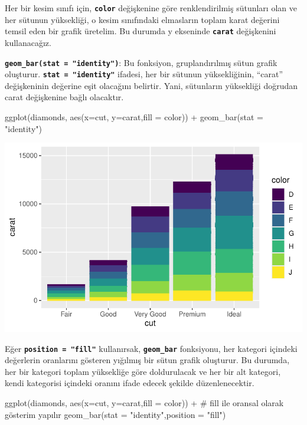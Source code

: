 \documentclass[
  letterpaper,
  DIV=11,
  numbers=noendperiod]{scrreprt}
\newenvironment{Shaded}{\begin{snugshade}}{\end{snugshade}}
\newcommand{\AttributeTok}[1]{\textcolor[rgb]{0.40,0.45,0.13}{#1}}
\newcommand{\CommentTok}[1]{\textcolor[rgb]{0.37,0.37,0.37}{#1}}
\newcommand{\FunctionTok}[1]{\textcolor[rgb]{0.28,0.35,0.67}{#1}}
\newcommand{\NormalTok}[1]{\textcolor[rgb]{0.00,0.23,0.31}{#1}}
\newcommand{\SpecialCharTok}[1]{\textcolor[rgb]{0.37,0.37,0.37}{#1}}
\newcommand{\StringTok}[1]{\textcolor[rgb]{0.13,0.47,0.30}{#1}}
\begin{document}
Her bir kesim sınıfı için, \textbf{\texttt{color}} değişkenine göre
renklendirilmiş sütunları olan ve her sütunun yüksekliği, o kesim
sınıfındaki elmasların toplam karat değerini temsil eden bir grafik
üretelim. Bu durumda y ekseninde \textbf{\texttt{carat}} değişkenini
kullanacağız.

\textbf{\texttt{geom\_bar(stat\ =\ "identity")}}: Bu fonksiyon,
gruplandırılmış sütun grafik oluşturur.
\textbf{\texttt{stat\ =\ "identity"}} ifadesi, her bir sütunun
yüksekliğinin, ``carat'' değişkeninin değerine eşit olacağını belirtir.
Yani, sütunların yüksekliği doğrudan carat değişkenine bağlı olacaktır.

\begin{Shaded}
\begin{Highlighting}[]
\FunctionTok{ggplot}\NormalTok{(diamonds, }\FunctionTok{aes}\NormalTok{(}\AttributeTok{x=}\NormalTok{cut, }\AttributeTok{y=}\NormalTok{carat,}\AttributeTok{fill =}\NormalTok{ color)) }\SpecialCharTok{+}
  \FunctionTok{geom\_bar}\NormalTok{(}\AttributeTok{stat =} \StringTok{"identity"}\NormalTok{) }
\end{Highlighting}
\end{Shaded}

\includegraphics{ggplot2_files/figure-pdf/unnamed-chunk-17-1.pdf}

Eğer \textbf{\texttt{position\ =\ "fill"}} kullanırsak,
\textbf{\texttt{geom\_bar}} fonksiyonu, her kategori içindeki değerlerin
oranlarını gösteren yığılmış bir sütun grafik oluşturur. Bu durumda, her
bir kategori toplam yüksekliğe göre doldurulacak ve her bir alt
kategori, kendi kategorisi içindeki oranını ifade edecek şekilde
düzenlenecektir.

\begin{Shaded}
\begin{Highlighting}[]
\FunctionTok{ggplot}\NormalTok{(diamonds, }\FunctionTok{aes}\NormalTok{(}\AttributeTok{x=}\NormalTok{cut, }\AttributeTok{y=}\NormalTok{carat,}\AttributeTok{fill =}\NormalTok{ color)) }\SpecialCharTok{+}
  \CommentTok{\# fill ile oransal olarak gösterim yapılır}
  \FunctionTok{geom\_bar}\NormalTok{(}\AttributeTok{stat =} \StringTok{"identity"}\NormalTok{,}\AttributeTok{position =} \StringTok{"fill"}\NormalTok{) }
\end{Highlighting}
\end{Shaded}
\end{document}
